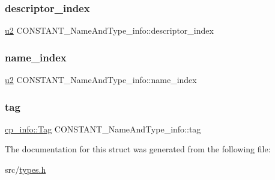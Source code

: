 \subsubsection{\texorpdfstring{descriptor\+\_\+index}{descriptor\_index}}
{\footnotesize\ttfamily \hyperlink{types_8h_ae676e9207f57fb921dca7366b2f59c53}{u2} C\+O\+N\+S\+T\+A\+N\+T\+\_\+\+Name\+And\+Type\+\_\+info\+::descriptor\+\_\+index}

\mbox{\label{structCONSTANT__NameAndType__info_adbaa813f9f3a32dc04a8bc65b5b2433d}} 
\subsubsection{\texorpdfstring{name\+\_\+index}{name\_index}}
{\footnotesize\ttfamily \hyperlink{types_8h_ae676e9207f57fb921dca7366b2f59c53}{u2} C\+O\+N\+S\+T\+A\+N\+T\+\_\+\+Name\+And\+Type\+\_\+info\+::name\+\_\+index}

\mbox{\label{structCONSTANT__NameAndType__info_a5a4f7d881529f76682bf58fd56d34d29}} 
\subsubsection{\texorpdfstring{tag}{tag}}
{\footnotesize\ttfamily \hyperlink{structcp__info_acdef8472ed83e12e3a87bca8d6001f69}{cp\+\_\+info\+::\+Tag} C\+O\+N\+S\+T\+A\+N\+T\+\_\+\+Name\+And\+Type\+\_\+info\+::tag}



The documentation for this struct was generated from the following file\+:\begin{DoxyCompactItemize}
\item 
src/\hyperlink{types_8h}{types.\+h}\end{DoxyCompactItemize}
